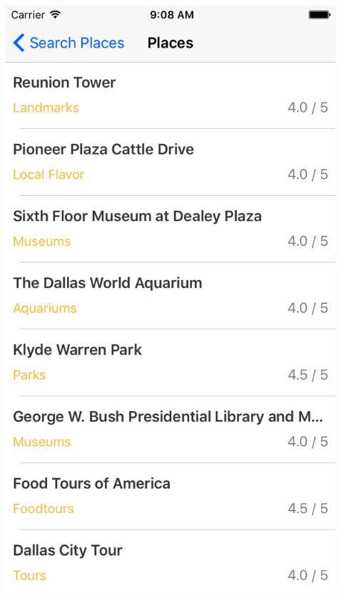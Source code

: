 \documentclass{beamer}
\begin{document}
\begin{frame}
\begin{columns}
\begin{column}{0.3\textwidth}
    \end{column}
    \begin{column}{0.3\textwidth}  %
        \begin{center}
            \includegraphics[scale=0.14]{placesTable} 
        \end{center}
    \end{column}
    \begin{column}{0.3\textwidth}  %
        \begin{center}

\end{center}
\end{column}
\end{columns}
\end{frame}
\end{document}
